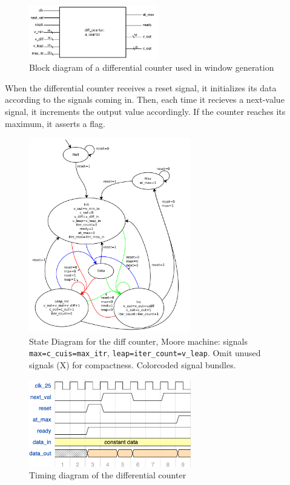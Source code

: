 \documentclass{article}
\begin{document}
\begin{figure}[h!]
  \centering
    \includegraphics[width=160pt]{block_diagrams/acounter.pdf}
  \caption{Block diagram of a differential counter used in window generation}
\end{figure}

When the differential counter receives a reset signal, it initializes
its data according to the signals coming in.  Then, each time it
recieves a next-value signal, it increments the output value
accordingly. If the counter reaches its maximum, it asserts a flag.

\begin{figure}[H]
  \centering
    \includegraphics[width=200pt]{state_diagrams/diff_counter.pdf}
  \caption{State Diagram for the diff counter, Moore machine: signals
    \texttt{max=c\_cuis=max\_itr}, \texttt{leap=iter\_count=v\_leap}. Omit
    unused signals (X) for compactness. Colorcoded signal bundles.}
\end{figure}

\begin{figure}[H]
  \centering
    \includegraphics[width=200pt]{timing_diagrams/diff_counter.pdf}
  \caption{Timing diagram of the differential counter}
\end{figure}
\end{document}
